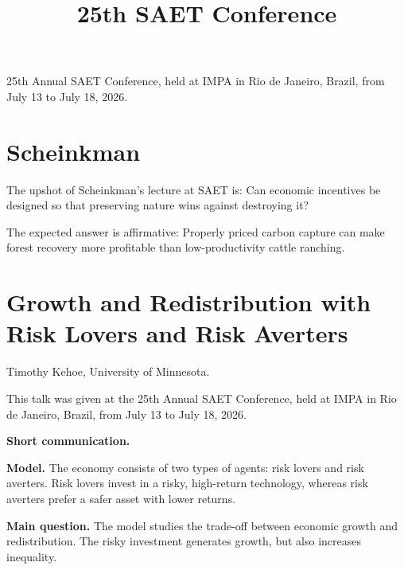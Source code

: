 



\title{25th SAET Conference}
\maketitle

\label{section-phantom}

\tableofcontents

25th Annual SAET Conference, held at
IMPA in Rio de Janeiro, Brazil, from July 13
to July 18, 2026.


\section{Scheinkman}
\label{section-scheinkman}

\noindent
The upshot of Scheinkman's lecture
at SAET is:
Can economic incentives be designed so that
preserving nature wins against destroying
it?

The expected answer is
affirmative: Properly priced carbon capture
can make forest recovery more profitable
than low-productivity cattle ranching.



\section{Growth and Redistribution with
Risk Lovers and Risk Averters}
\label{%
section-risk-lovers%
}

\medskip\noindent
Timothy Kehoe,
University of Minnesota.

\medskip\noindent
This talk was given at the 25th Annual
SAET Conference, held at IMPA in Rio de
Janeiro, Brazil, from July 13 to
July 18, 2026.

\medskip\noindent
{\bf Short communication.}

\medskip\noindent
{\bf Model.}
The economy consists of two types of
agents: risk lovers and risk
averters. Risk lovers invest in a
risky, high-return technology,
whereas risk averters prefer a safer
asset with lower returns.

\medskip\noindent
{\bf Main question.}
The model studies the trade-off
between economic growth and
redistribution. The risky investment
generates growth, but also increases
inequality.

